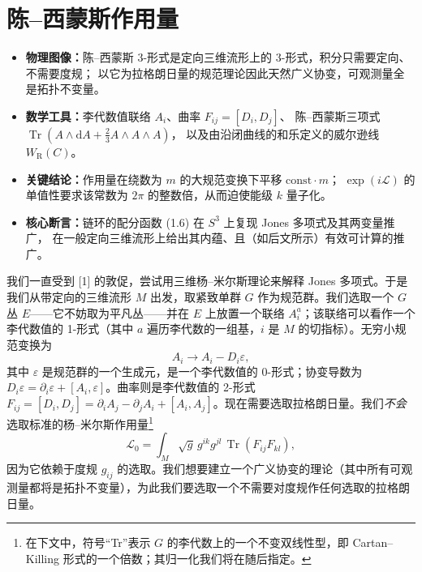 \documentclass[11pt,a4paper]{article}
\DeclareMathOperator{\Tr}{Tr}
\newenvironment{keypoints}{%
    \par\medskip
    \begin{tcolorbox}[enhanced, breakable,
        colback=blue!4!white, colframe=blue!40!black,
        boxrule=0.5pt, arc=2pt, left=6pt, right=6pt, top=4pt, bottom=4pt,
        title={\small\textbf{本节重点}\quad{\footnotesize（译者所加，非原文内容）}},
        fonttitle=\bfseries, coltitle=black, colbacktitle=blue!10!white,
        toptitle=1pt, bottomtitle=1pt]
    \begin{itemize}[leftmargin=1.4em, itemsep=2pt, topsep=2pt, parsep=0pt]
}{%
    \end{itemize}
    \end{tcolorbox}
    \par\medskip
}
\begin{document}
\section{陈–西蒙斯作用量}

\begin{keypoints}
    \item \textbf{物理图像：}陈–西蒙斯 3-形式是定向三维流形上的 3-形式，积分只需要定向、不需要度规；
          以它为拉格朗日量的规范理论因此天然广义协变，可观测量全是拓扑不变量。
    \item \textbf{数学工具：}李代数值联络 $A_i$、曲率 $F_{ij}=[D_i,D_j]$、
          陈–西蒙斯三项式 $\Tr(A\wedge\mathrm{d}A+\frac{2}{3}A\wedge A\wedge A)$，
          以及由沿闭曲线的和乐定义的威尔逊线 $W_{\mathrm{R}}(C)$。
    \item \textbf{关键结论：}作用量在绕数为 $m$ 的大规范变换下平移 $\mathrm{const}\cdot m$；
          $\exp(i\mathcal{L})$ 的单值性要求该常数为 $2\pi$ 的整数倍，从而迫使能级 $k$ 量子化。
    \item \textbf{核心断言：}链环的配分函数 (1.6) 在 $S^3$ 上复现 Jones 多项式及其两变量推广，
          在一般定向三维流形上给出其内蕴、且（如后文所示）有效可计算的推广。
\end{keypoints}

我们一直受到 [1] 的敦促，尝试用三维杨–米尔斯理论来解释 Jones 多项式。于是我们从带定向的三维流形 $M$ 出发，取紧致单群 $G$ 作为规范群。我们选取一个 $G$ 丛 $E$——它不妨取为平凡丛——并在 $E$ 上放置一个联络 $A_i^a$；该联络可以看作一个李代数值的 1-形式（其中 $a$ 遍历李代数的一组基，$i$ 是 $M$ 的切指标）。无穷小规范变换为
\begin{equation}
    A_i \to A_i - D_i\varepsilon,
    \tag{1.1}
\end{equation}
其中 $\varepsilon$ 是规范群的一个生成元，是一个李代数值的 0-形式；协变导数为 $D_i\varepsilon=\partial_i\varepsilon+[A_i,\varepsilon]$。曲率则是李代数值的 2-形式 $F_{ij}=[D_i,D_j]=\partial_iA_j-\partial_jA_i+[A_i,A_j]$。现在需要选取拉格朗日量。我们\emph{不会}选取标准的杨–米尔斯作用量\footnote{在下文中，符号“Tr”表示 $G$ 的李代数上的一个不变双线性型，即 Cartan--Killing 形式的一个倍数；其归一化我们将在随后指定。}
\begin{equation}
    \mathcal{L}_0=\int_M \sqrt{g}\,g^{ik}g^{jl}\,\Tr(F_{ij}F_{kl}),
    \tag{1.2}
\end{equation}
因为它依赖于度规 $g_{ij}$ 的选取。我们想要建立一个广义协变的理论（其中所有可观测量都将是拓扑不变量），为此我们要选取一个不需要对度规作任何选取的拉格朗日量。
\end{document}
